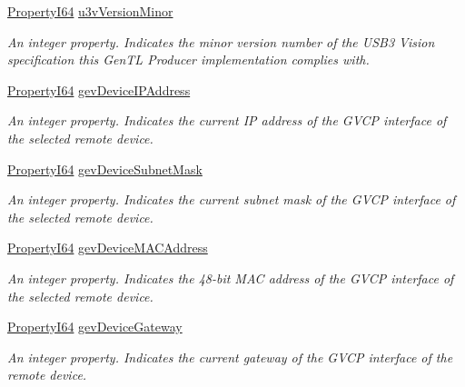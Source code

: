 \begin{DoxyCompactItemize}
\hyperlink{group___common_interface_ga81749b2696755513663492664a18a893}{Property\+I64} \hyperlink{classmv_i_m_p_a_c_t_1_1acquire_1_1_gen_i_cam_1_1_device_module_a30f7b5107030f1ec826e3f570cb7a329}{u3v\+Version\+Minor}
\begin{DoxyCompactList}\small\item\em An integer property. Indicates the minor version number of the U\+S\+B3 Vision specification this Gen\+T\+L Producer implementation complies with. \end{DoxyCompactList}\item 
\hyperlink{group___common_interface_ga81749b2696755513663492664a18a893}{Property\+I64} \hyperlink{classmv_i_m_p_a_c_t_1_1acquire_1_1_gen_i_cam_1_1_device_module_aca13ae83a961849ca45b359a7b477d2b}{gev\+Device\+I\+P\+Address}
\begin{DoxyCompactList}\small\item\em An integer property. Indicates the current I\+P address of the G\+V\+C\+P interface of the selected remote device. \end{DoxyCompactList}\item 
\hyperlink{group___common_interface_ga81749b2696755513663492664a18a893}{Property\+I64} \hyperlink{classmv_i_m_p_a_c_t_1_1acquire_1_1_gen_i_cam_1_1_device_module_a553e881a9dc4dd3c417e150107a9ae2e}{gev\+Device\+Subnet\+Mask}
\begin{DoxyCompactList}\small\item\em An integer property. Indicates the current subnet mask of the G\+V\+C\+P interface of the selected remote device. \end{DoxyCompactList}\item 
\hyperlink{group___common_interface_ga81749b2696755513663492664a18a893}{Property\+I64} \hyperlink{classmv_i_m_p_a_c_t_1_1acquire_1_1_gen_i_cam_1_1_device_module_a6ab8293a3ff60448a8975b50f68e4ebd}{gev\+Device\+M\+A\+C\+Address}
\begin{DoxyCompactList}\small\item\em An integer property. Indicates the 48-\/bit M\+A\+C address of the G\+V\+C\+P interface of the selected remote device. \end{DoxyCompactList}\item 
\hyperlink{group___common_interface_ga81749b2696755513663492664a18a893}{Property\+I64} \hyperlink{classmv_i_m_p_a_c_t_1_1acquire_1_1_gen_i_cam_1_1_device_module_aa331900f06d6838f4d1e11bf2355afb2}{gev\+Device\+Gateway}
\begin{DoxyCompactList}\small\item\em An integer property. Indicates the current gateway of the G\+V\+C\+P interface of the remote device. \end{DoxyCompactList}\item 

\end{DoxyCompactItemize}
